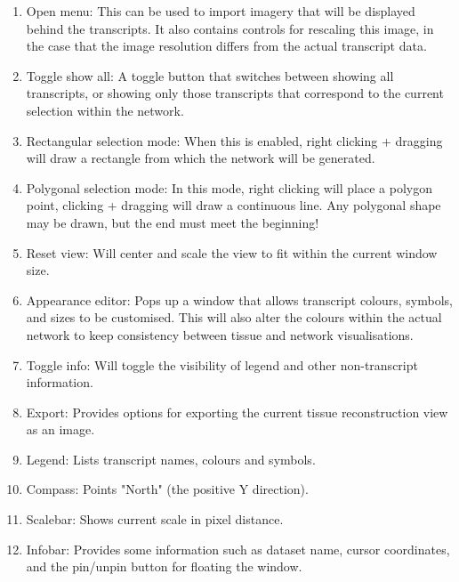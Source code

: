 \documentclass[a4paper,12pt]{article}
\begin{document}
\begin{enumerate}
	\item Open menu: This can be used to import imagery that will be displayed behind the transcripts. It also contains controls for rescaling this image, in the case that the image resolution differs from the actual transcript data.
	\item Toggle show all: A toggle button that switches between showing all transcripts, or showing only those transcripts that correspond to the current selection within the network.
	\item Rectangular selection mode: When this is enabled, right clicking + dragging will draw a rectangle from which the network will be generated.
	\item Polygonal selection mode: In this mode, right clicking will place a polygon point, clicking + dragging will draw a continuous line. Any polygonal shape may be drawn, but the end must meet the beginning!
	\item Reset view: Will center and scale the view to fit within the current window size.
	\item Appearance editor: Pops up a window that allows transcript colours, symbols, and sizes to be customised. This will also alter the colours within the actual network to keep consistency between tissue and network visualisations. 
	\item Toggle info: Will toggle the visibility of legend and other non-transcript information.
	\item Export: Provides options for exporting the current tissue reconstruction view as an image.
	\item Legend: Lists transcript names, colours and symbols.
	\item Compass: Points "North" (the positive Y direction).
	\item Scalebar: Shows current scale in pixel distance.
	\item Infobar: Provides some information such as dataset name, cursor coordinates, and the pin/unpin button for floating the window.
\end{enumerate}
\end{document}
